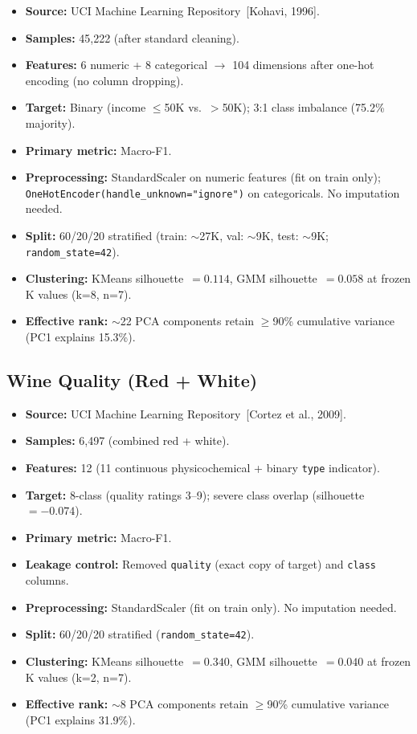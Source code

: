 \documentclass[letterpaper, 11pt]{article}
\begin{document}
\begin{itemize}
\item \textbf{Source:} UCI Machine Learning Repository~[Kohavi, 1996].
\item \textbf{Samples:} 45,222 (after standard cleaning).
\item \textbf{Features:} 6 numeric + 8 categorical $\rightarrow$ 104 dimensions after one-hot encoding (no column dropping).
\item \textbf{Target:} Binary (income $\leq$50K vs.\ $>$50K); 3:1 class imbalance (75.2\% majority).
\item \textbf{Primary metric:} Macro-F1.
\item \textbf{Preprocessing:} StandardScaler on numeric features (fit on train only);
  \texttt{OneHotEncoder(\allowbreak handle\_unknown=\allowbreak"ignore")} on categoricals. No imputation needed.
\item \textbf{Split:} 60/20/20 stratified (train: $\sim$27K, val: $\sim$9K, test: $\sim$9K; \texttt{random\_state=42}).
\item \textbf{Clustering:} KMeans silhouette~$=0.114$, GMM silhouette~$=0.058$ at frozen K values (k=8, n=7).
\item \textbf{Effective rank:} $\sim$22 PCA components retain $\geq$90\% cumulative variance (PC1 explains 15.3\%).
\end{itemize}

\subsection{Wine Quality (Red + White)}

\begin{itemize}
\item \textbf{Source:} UCI Machine Learning Repository~[Cortez et al., 2009].
\item \textbf{Samples:} 6,497 (combined red + white).
\item \textbf{Features:} 12 (11 continuous physicochemical + binary \texttt{type} indicator).
\item \textbf{Target:} 8-class (quality ratings 3--9); severe class overlap (silhouette~$= -0.074$).
\item \textbf{Primary metric:} Macro-F1.
\item \textbf{Leakage control:} Removed \texttt{quality} (exact copy of target) and \texttt{class} columns.
\item \textbf{Preprocessing:} StandardScaler (fit on train only). No imputation needed.
\item \textbf{Split:} 60/20/20 stratified (\texttt{random\_state=42}).
\item \textbf{Clustering:} KMeans silhouette~$=0.340$, GMM silhouette~$=0.040$ at frozen K values (k=2, n=7).
\item \textbf{Effective rank:} $\sim$8 PCA components retain $\geq$90\% cumulative variance (PC1 explains 31.9\%).
\end{itemize}
\end{document}
